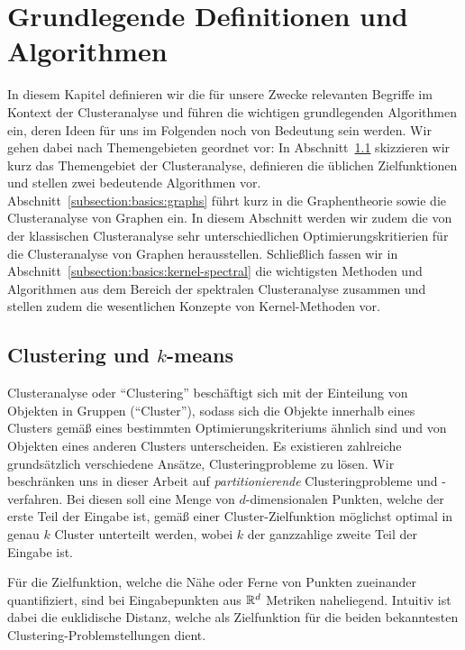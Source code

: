 \section{Grundlegende Definitionen und Algorithmen}
\label{section:basics}

In diesem Kapitel definieren wir die für unsere Zwecke relevanten Begriffe im Kontext der Clusteranalyse und führen die
wichtigen grundlegenden Algorithmen ein, deren Ideen für uns im Folgenden noch von Bedeutung sein werden. Wir gehen dabei
nach Themengebieten geordnet vor: In Abschnitt~\ref{subsection:basics:clustering} skizzieren wir kurz das
Themengebiet der Clusteranalyse, definieren die üblichen Zielfunktionen und stellen zwei bedeutende Algorithmen vor.
Abschnitt~\ref{subsection:basics:graphs} führt kurz in die Graphentheorie sowie die Clusteranalyse von Graphen ein. In diesem
Abschnitt werden wir zudem die von der klassischen Clusteranalyse sehr unterschiedlichen Optimierungskritierien für die
Clusteranalyse von Graphen herausstellen. Schließlich fassen wir in Abschnitt~\ref{subsection:basics:kernel-spectral} die
wichtigsten Methoden und Algorithmen aus dem Bereich der spektralen Clusteranalyse zusammen und stellen zudem die wesentlichen
Konzepte von Kernel-Methoden vor.

\subsection{Clustering und \texorpdfstring{$k$}{k}-means}
\label{subsection:basics:clustering}

Clusteranalyse oder "`Clustering"' beschäftigt sich mit der Einteilung von Objekten in Gruppen ("`Cluster"'), sodass
sich die Objekte innerhalb eines Clusters gemäß eines bestimmten Optimierungskriteriums ähnlich sind und von Objekten eines
anderen Clusters unterscheiden. Es existieren zahlreiche grundsätzlich verschiedene Ansätze, Clusteringprobleme zu lösen.
Wir beschränken uns in dieser Arbeit auf \emph{partitionierende} Clusteringprobleme und -verfahren. Bei diesen
soll eine Menge von $d$-dimensionalen Punkten, welche der erste Teil der Eingabe ist, gemäß einer Cluster-Zielfunktion möglichst
optimal in genau $k$ Cluster unterteilt werden, wobei $k$ der ganzzahlige zweite Teil der Eingabe ist.

Für die Zielfunktion, welche die Nähe oder Ferne von Punkten zueinander quantifiziert, sind bei Eingabepunkten aus
$\mathbb{R}^{d}$ Metriken naheliegend. Intuitiv ist dabei die euklidische Distanz, welche als Zielfunktion für die beiden bekanntesten
Clustering-Problemstellungen dient.

